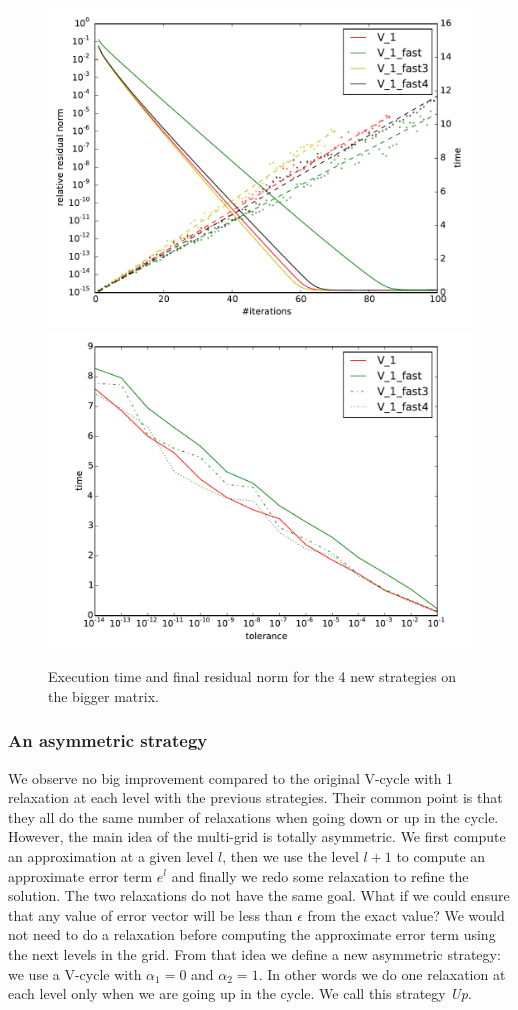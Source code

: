 \documentclass[a4paper,10pt]{article}
\begin{document}
  \begin{figure}
  \includegraphics[width=0.49\linewidth]{figs/convergence_fast.pdf}
   \includegraphics[width=0.49\linewidth]{figs/time_convergence_fast.pdf}
   \caption{Execution time and final residual norm for the 4 new strategies on the bigger matrix.}
   \label{fig.newstrat}
  \end{figure}
  
\subsubsection{An asymmetric strategy}
  We observe no big improvement compared to the original V-cycle with 1 relaxation at each level with the previous strategies.
  Their common point is that they all do the same number of relaxations when going down or up in the cycle. However, the main idea of the multi-grid is totally asymmetric.
  We first compute an approximation at a given level $l$, then we use the level $l+1$ to compute an approximate error term $e^l$ and finally we redo some relaxation to refine the solution. The two relaxations do not have the same goal.
  What if we could ensure that any value of error vector will be less than $\epsilon$ from the exact value? We would not need to do a relaxation
  before computing the approximate error term using the next levels in the grid. From that idea we define a new asymmetric strategy: we use a V-cycle with $\alpha_1 = 0$ and $\alpha_2 = 1$. In other words
  we do one relaxation at each level only when we are going up in the cycle. We call this strategy \emph{Up}.
  
\end{document}
